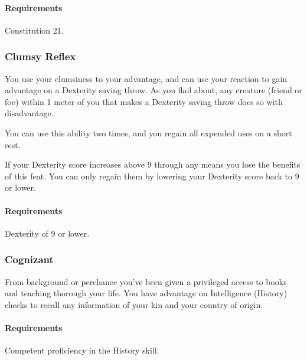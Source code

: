     \paragraph{Requirements} Constitution 21.
\subsubsection{Clumsy Reflex} \label{feat::clumsyreflex}
    You use your clumsiness to your advantage, and can use your reaction to gain advantage on a Dexterity saving throw.
    As you flail about, any creature (friend or foe) within 1 meter of you that makes a Dexterity saving throw does so with disadvantage.

    You can use this ability two times, and you regain all expended uses on a short rest.

    If your Dexterity score increases above 9 through any means you lose the benefits of this feat.
    You can only regain them by lowering your Dexterity score back to 9 or lower.
    \paragraph{Requirements} Dexterity of 9 or lower.
\subsubsection{Cognizant} \label{feat::cognizant}
    From background or perchance you've been given a privileged access to books and teaching thorough your life.
    You have advantage on Intelligence (History) checks to recall any information of your kin and your country of origin.
    \paragraph{Requirements} Competent proficiency in the History skill.
